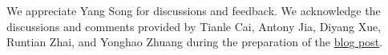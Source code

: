 \documentclass{article}
\begin{document}
We appreciate Yang Song for discussions and feedback. We acknowledge the discussions and comments provided by Tianle Cai, Antony Jia, Diyang Xue, Runtian Zhai, and Yonghao Zhuang during the preparation of the \href{https://gsunshine.notion.site/Consistency-Models-Made-Easy-954205c0b4a24c009f78719f43b419cc}{blog post}.



 
% 
%  

\newpage
\appendix


\end{document}
